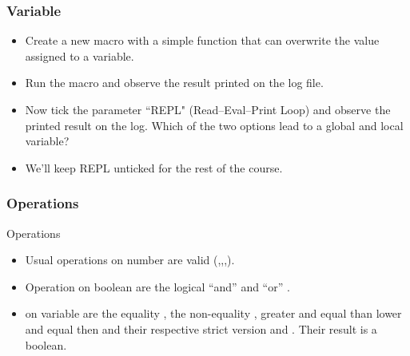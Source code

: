    \begin{frame}
   	\frametitle<presentation>{Variable}
   	\begin{example}
   		\begin{itemize}
   			\item Create a new macro with a simple function that can overwrite the value assigned to a variable.\par
   			
   			\item Run the macro and observe the result printed on the log file.
   			\item Now tick the parameter ``REPL" (Read–Eval–Print Loop) and observe the printed result on the log. Which of the two options lead to a global and local variable? 
   			\item We'll keep REPL unticked for the rest of the course.
   		\end{itemize}
   	\end{example}
   \end{frame}
   
   
  \begin{frame}
  	\frametitle<presentation>{Operations}
  \begin{block}{Operations}
    \begin{itemize}
    \item Usual operations on number are valid (\code{+},\code{-},\code{*},\code{/}).
    \item Operation on boolean are the logical ``and'' \code{\&\&} and ``or''  \code{||}.
    \item {} on variable are the equality \code{==},
      the non-equality \code{!=}, greater and equal than \code{>=}
      lower and equal then \code{<=} and their respective strict
      version \code{>} and \code{<}. Their result is a boolean.
    \end{itemize}
  \end{block}
\end{frame}

